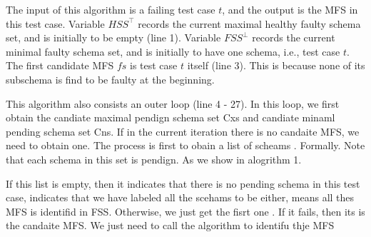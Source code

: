 \documentclass{sig-alternate-05-2015}
\begin{document}
{{The input of this algorithm is a failing test case $t$, and the output is the MFS in this test case. Variable $HSS^{\top}$ records the current maximal healthy faulty schema set, and is initially to be empty (line 1).   Variable $FSS^{\bot}$ records the current minimal faulty schema set, and is initially to have one schema, i.e., test case $t$. The first candidate MFS $fs$ is test case $t$ itself (line 3). This is because none of its subschema is find to be faulty at the beginning.

This algorithm also consists an outer loop (line 4 - 27). In this loop, we first obtain the candiate maximal pendign schema set Cxs and candiate minaml pending schema set Cns. If in the current iteration there is no candaite MFS, we need to obtain one. The process is first to obain a list of scheams . Formally. Note that each schema in this set is pendign. As we show in alogrithm 1. 

If this list is empty, then it indicates that there is no pending schema in this test case, indicates that we have labeled all the scehams to be either, means all thes MFS is identifid in FSS.  Otherwise, we just get the fisrt one . If it fails, then its is the candaite MFS. We just need to call the algorithm to identifu thje MFS


}}
\end{document}

